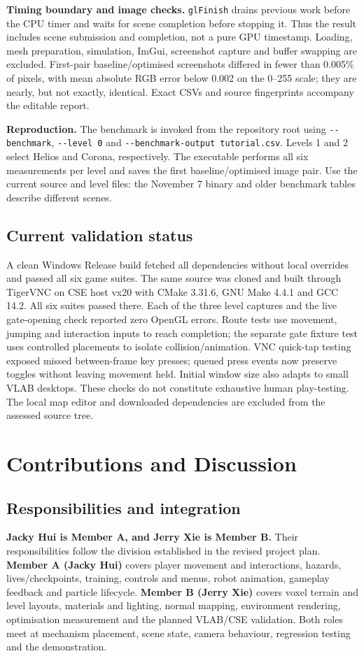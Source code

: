 \documentclass[10pt,a4paper,twocolumn]{article}
\newcommand{\code}[1]{\texttt{#1}}
\begin{document}
\textbf{Timing boundary and image checks.} \code{glFinish} drains previous work before the CPU timer and waits for scene completion before stopping it. Thus the result includes scene submission and completion, not a pure GPU timestamp. Loading, mesh preparation, simulation, ImGui, screenshot capture and buffer swapping are excluded. First-pair baseline/optimised screenshots differed in fewer than 0.005\% of pixels, with mean absolute RGB error below 0.002 on the 0--255 scale; they are nearly, but not exactly, identical. Exact CSVs and source fingerprints accompany the editable report.

\textbf{Reproduction.} The benchmark is invoked from the repository root using \code{-{}-benchmark}, \code{-{}-level 0} and \code{-{}-benchmark-output tutorial.csv}. Levels 1 and 2 select Helios and Corona, respectively. The executable performs all six measurements per level and saves the first baseline/optimised image pair. Use the current source and level files: the November 7 binary and older benchmark tables describe different scenes.

\subsection{Current validation status}
A clean Windows Release build fetched all dependencies without local overrides and passed all six game suites. The same source was cloned and built through TigerVNC on CSE host vx20 with CMake 3.31.6, GNU Make 4.4.1 and GCC 14.2. All six suites passed there. Each of the three level captures and the live gate-opening check reported zero OpenGL errors. Route tests use movement, jumping and interaction inputs to reach completion; the separate gate fixture test uses controlled placements to isolate collision/animation. VNC quick-tap testing exposed missed between-frame key presses; queued press events now preserve toggles without leaving movement held. Initial window size also adapts to small VLAB desktops. These checks do not constitute exhaustive human play-testing. The local map editor and downloaded dependencies are excluded from the assessed source tree.


\section{Contributions and Discussion}\label{sec:discussion}
\subsection{Responsibilities and integration}
\textbf{Jacky Hui is Member A, and Jerry Xie is Member B.} Their responsibilities follow the division established in the revised project plan. \textbf{Member A (Jacky Hui)} covers player movement and interactions, hazards, lives/checkpoints, training, controls and menus, robot animation, gameplay feedback and particle lifecycle. \textbf{Member B (Jerry Xie)} covers voxel terrain and level layouts, materials and lighting, normal mapping, environment rendering, optimisation measurement and the planned VLAB/CSE validation. Both roles meet at mechanism placement, scene state, camera behaviour, regression testing and the demonstration.
\end{document}
